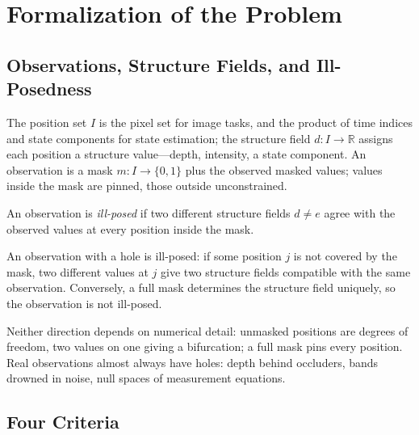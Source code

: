 \section{Formalization of the Problem}
\label{ch:formalize}

\subsection{Observations, Structure Fields, and Ill-Posedness}

The position set $I$ is the pixel set for image tasks, and the product of time indices and state components for state estimation; the structure field $d : I \to \mathbb{R}$ assigns each position a structure value---depth, intensity, a state component. An observation is a mask $m : I \to \{0, 1\}$ plus the observed masked values; values inside the mask are pinned, those outside unconstrained.

\begin{defn}
An observation is \emph{ill-posed} if two different structure fields $d \neq e$ agree with the observed values at every position inside the mask.
\end{defn}

\begin{uprop}
An observation with a hole is ill-posed: if some position $j$ is not covered by the mask, two different values at $j$ give two structure fields compatible with the same observation. Conversely, a full mask determines the structure field uniquely, so the observation is not ill-posed.
\end{uprop}

Neither direction depends on numerical detail: unmasked positions are degrees of freedom, two values on one giving a bifurcation; a full mask pins every position. Real observations almost always have holes: depth behind occluders, bands drowned in noise, null spaces of measurement equations.

\subsection{Four Criteria}

